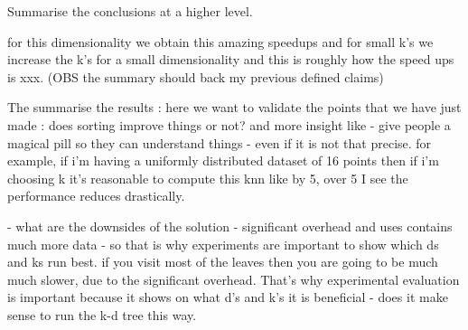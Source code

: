 Summarise the conclusions at a higher level. 

for this dimensionality we obtain this amazing speedups and for small k's we increase the k's for a small dimensionality and this is roughly how the speed ups is xxx. (OBS the summary should back my previous defined claims)

The summarise the results : here we want to validate the points that we have just made : does sorting improve things or not? and more insight like - give people a magical pill so they can understand things - even if it is not that precise. for example, if i'm having a uniformly distributed dataset of 16 points then if i'm choosing k it's reasonable to compute this knn like by 5, over 5 I see the performance reduces drastically.   

- what are the downsides of the solution - significant overhead and uses contains much more data - so that is why experiments are important to show which ds and ks run best. 
	if you visit most of the leaves then you are going to be much much slower, due to the significant overhead. That's why experimental evaluation is important because it shows on what d's and k's it is beneficial - does it make sense to run the k-d tree this way.  






